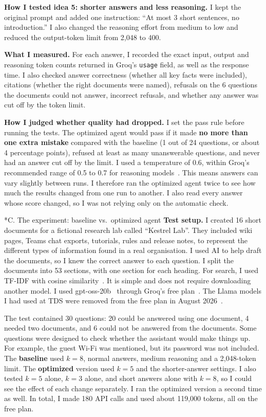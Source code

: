 \documentclass[10pt,a4paper]{article}
\makeatletter
\renewcommand\section{\@startsection{section}{1}{\z@}{0.9em}{0.35em}{\normalfont\large\bfseries}}
\makeatother
\begin{document}
\textbf{How I tested idea 5: shorter answers and less reasoning.}
I kept the original prompt and added one instruction: ``At most 3 short sentences, no introduction.'' I also changed the reasoning effort from medium to low and reduced the output-token limit from 2{,}048 to 400.

\textbf{What I measured.}
For each answer, I recorded the exact input, output and reasoning token counts returned in Groq's \texttt{usage} field, as well as the response time. I also checked answer correctness (whether all key facts were included), citations (whether the right documents were named), refusals on the 6 questions the documents could not answer, incorrect refusals, and whether any answer was cut off by the token limit.

\textbf{How I judged whether quality had dropped.}
I set the pass rule before running the tests. The optimized agent would pass if it made \textbf{no more than one extra mistake} compared with the baseline (1 out of 24 questions, or about 4 percentage points), refused at least as many unanswerable questions, and never had an answer cut off by the limit.
I used a temperature of 0.6, within Groq's recommended range of 0.5 to 0.7 for reasoning models~\cite{groqreasoning}. This means answers can vary slightly between runs. I therefore ran the optimized agent twice to see how much the results changed from one run to another.
I also read every answer whose score changed, so I was not relying only on the automatic check.

\section*{C. The experiment: baseline vs.\ optimized agent}
\textbf{Test setup.}
I created 16 short documents for a fictional research lab called ``Kestrel Lab''. They included wiki pages, Teams chat exports, tutorials, rules and release notes, to represent the different types of information found in a real organisation. I used AI to help draft the documents, so I knew the correct answer to each question. I split the documents into 53 sections, with one section for each heading.
For search, I used TF-IDF with cosine similarity~\cite{manning}. It is simple and does not require downloading another model. I used gpt-oss-20b~\cite{gptoss} through Groq's free plan~\cite{groqlimits}. The Llama models I had used at TDS were removed from the free plan in August 2026~\cite{groqdeprecations}.

The test contained 30 questions: 20 could be answered using one document, 4 needed two documents, and 6 could not be answered from the documents. Some questions were designed to check whether the assistant would make things up. For example, the guest Wi-Fi was mentioned, but its password was not included.
The \textbf{baseline} used $k{=}8$, normal answers, medium reasoning and a 2{,}048-token limit. The \textbf{optimized} version used $k{=}5$ and the shorter-answer settings. I also tested $k{=}5$ alone, $k{=}3$ alone, and short answers alone with $k{=}8$, so I could see the effect of each change separately. I ran the optimized version a second time as well. In total, I made 180 API calls and used about 119{,}000 tokens, all on the free plan.
\end{document}
